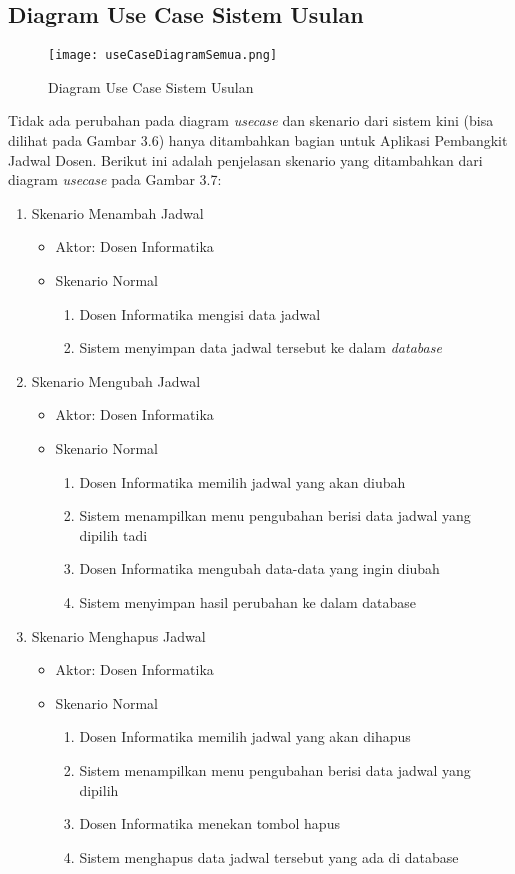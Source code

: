\subsection{Diagram Use Case Sistem Usulan}
\begin{figure} [H]
	\centering  
	\texttt{[image: useCaseDiagramSemua.png]}
	\caption[Diagram Use Case Sistem Usulan]{Diagram Use Case Sistem Usulan} 
	\label{fig:flow-chart-CodeIgniter} 
\end{figure}

Tidak ada perubahan pada diagram \textit{usecase} dan skenario dari sistem kini (bisa dilihat pada Gambar 3.6) hanya ditambahkan bagian untuk Aplikasi Pembangkit Jadwal Dosen. Berikut ini adalah penjelasan skenario yang ditambahkan dari diagram \textit{usecase} pada Gambar 3.7:
\begin{enumerate}
	\item Skenario Menambah Jadwal
	\begin{itemize}
		\item Aktor: Dosen Informatika
		\item Skenario Normal
			\begin{enumerate}[1.]
				\item Dosen Informatika mengisi data jadwal
				\item Sistem menyimpan data jadwal tersebut ke dalam \textit{database}
			\end{enumerate}
	\end{itemize}

	\item Skenario Mengubah Jadwal
	\begin{itemize}
		\item Aktor: Dosen Informatika
		\item Skenario Normal
			\begin{enumerate}[1.]
				\item Dosen Informatika memilih jadwal yang akan diubah
				\item Sistem menampilkan menu pengubahan berisi data jadwal yang dipilih tadi
				\item Dosen Informatika mengubah data-data yang ingin diubah
				\item Sistem menyimpan hasil perubahan ke dalam database
			\end{enumerate}
	\end{itemize}


	\item Skenario Menghapus Jadwal
	\begin{itemize}
		\item Aktor: Dosen Informatika
		\item Skenario Normal
			\begin{enumerate}[1.]
				\item Dosen Informatika memilih jadwal yang akan dihapus
				\item Sistem menampilkan menu pengubahan berisi data jadwal yang dipilih
				\item Dosen Informatika menekan tombol hapus
				\item Sistem menghapus data jadwal tersebut yang ada di database
			\end{enumerate}
	\end{itemize}


\end{enumerate}
